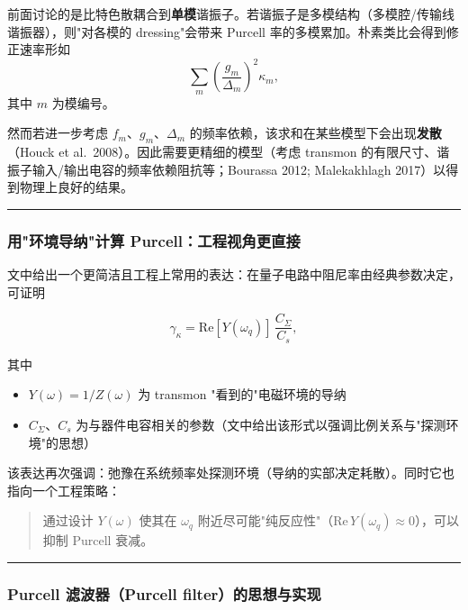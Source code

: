 \documentclass[12pt,a4paper,oneside]{ctexbook}
\begin{document}
前面讨论的是比特色散耦合到\textbf{单模}谐振子。若谐振子是多模结构（多模腔/传输线谐振器），则"对各模的 dressing"会带来 Purcell 率的多模累加。朴素类比会得到修正速率形如
\begin{equation}
\sum_m \left(\frac{g_m}{\Delta_m}\right)^2 \kappa_m,
\end{equation}
其中 $m$ 为模编号。

然而若进一步考虑 $f_m$、$g_m$、$\Delta_m$ 的频率依赖，该求和在某些模型下会出现\textbf{发散}（Houck et al.\ 2008）。因此需要更精细的模型（考虑 transmon 的有限尺寸、谐振子输入/输出电容的频率依赖阻抗等；Bourassa 2012; Malekakhlagh 2017）以得到物理上良好的结果。

\bigskip\hrule\bigskip

\subsubsection{用"环境导纳"计算 Purcell：工程视角更直接}

文中给出一个更简洁且工程上常用的表达：在量子电路中阻尼率由经典参数决定，可证明

\begin{equation}
\gamma_\kappa=\mathrm{Re}[Y(\omega_q)]\,\frac{C_\Sigma}{C_s},
\end{equation}

其中
\begin{itemize}
  \item $Y(\omega)=1/Z(\omega)$ 为 transmon "看到的"电磁环境的导纳
  \item $C_\Sigma$、$C_s$ 为与器件电容相关的参数（文中给出该形式以强调比例关系与"探测环境"的思想）
\end{itemize}

该表达再次强调：弛豫在系统频率处探测环境（导纳的实部决定耗散）。同时它也指向一个工程策略：

\begin{quote}
通过设计 $Y(\omega)$ 使其在 $\omega_q$ 附近尽可能"纯反应性"（$\mathrm{Re}\,Y(\omega_q)\approx 0$），可以抑制 Purcell 衰减。
\end{quote}

\bigskip\hrule\bigskip

\subsubsection{Purcell 滤波器（Purcell filter）的思想与实现}
\end{document}
